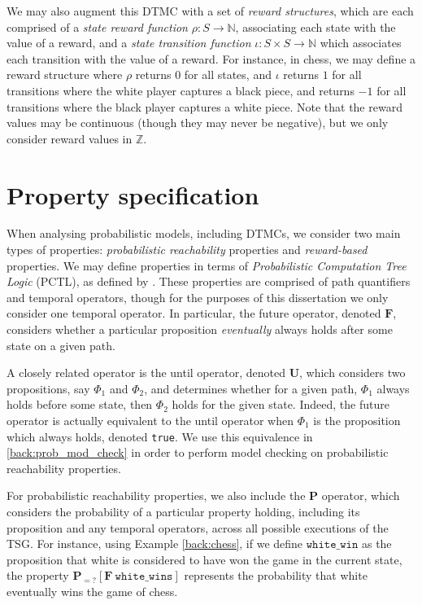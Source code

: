 We may also augment this DTMC with a set of \emph{reward structures}, which are each comprised of a \emph{state reward function} $\rho : S \rightarrow \mathbb{N}$, associating each state with the value of a reward, and a \emph{state transition function} $\iota : S \times S \rightarrow \mathbb{N}$ which associates each transition with the value of a reward. For instance, in chess, we may define a reward structure where $\rho$ returns $0$ for all states, and $\iota$ returns $1$ for all transitions where the white player captures a black piece, and returns $-1$ for all transitions where the black player captures a white piece. Note that the reward values may be continuous (though they may never be negative), but we only consider reward values in $\mathbb{Z}$.

\section{Property specification}
\label{back:prop_spec}

When analysing probabilistic models, including DTMCs, we consider two main types of properties: \emph{probabilistic reachability} properties and \emph{reward-based} properties. We may define properties in terms of \emph{Probabilistic Computation Tree Logic} (PCTL), as defined by \cite{hansson_logic_1994}. These properties are comprised of path quantifiers and temporal operators, though for the purposes of this dissertation we only consider one temporal operator. In particular, the future operator, denoted $\mathbf{F}$, considers whether a particular proposition \emph{eventually} always holds after some state on a given path.

A closely related operator is the until operator, denoted  $\mathbf{U}$, which considers two propositions, say $\Phi_1$ and $\Phi_2$, and determines whether for a given path, $\Phi_1$ always holds before some state, then $\Phi_2$ holds for the given state. Indeed, the future operator is actually equivalent to the until operator when $\Phi_1$ is the proposition which always holds, denoted \verb+true+. We use this equivalence in \ref{back:prob_mod_check} in order to perform model checking on probabilistic reachability properties.

For probabilistic reachability properties, we also include the $\mathbf{P}$ operator, which considers the probability of a particular property holding, including its proposition and any temporal operators, across all possible executions of the TSG. For instance, using Example \ref{back:chess}, if we define $\mathtt{white\_win}$ as the proposition that white is considered to have won the game in the current state, the property $\mathbf{P}_{=?} [\mathbf{F}\ \mathtt{white\_wins}]$ represents the probability that white eventually wins the game of chess.

